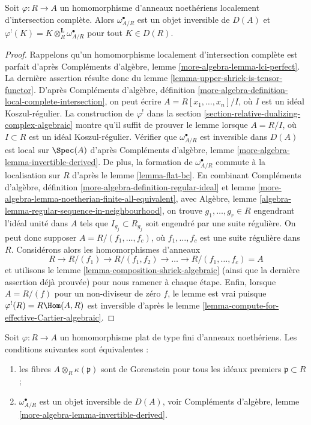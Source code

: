 \begin{lemma}
\label{lemma-lci-shriek}
Soit $\varphi : R \to A$ un homomorphisme d'anneaux noethériens localement d'intersection complète.
Alors $\omega_{A/R}^\bullet$ est un objet inversible de $D(A)$ et $\varphi^!(K) = K \otimes_R^\mathbf{L} \omega_{A/R}^\bullet$ pour tout $K \in D(R)$.
\end{lemma}

\begin{proof}
Rappelons qu'un homomorphisme localement d'intersection complète
est parfait d'après Compléments d'algèbre, lemme \ref{more-algebra-lemma-lci-perfect}.
La dernière assertion résulte donc du lemme \ref{lemma-upper-shriek-is-tensor-functor}.
D'après Compléments d'algèbre, définition \ref{more-algebra-definition-local-complete-intersection},
on peut écrire $A = R[x_1, \ldots, x_n]/I$, où $I$ est un idéal Koszul-régulier.
La construction de $\varphi^!$ dans la section \ref{section-relative-dualizing-complex-algebraic}
montre qu'il suffit de prouver le lemme lorsque $A = R/I$,
où $I \subset R$ est un idéal Koszul-régulier.
Vérifier que $\omega_{A/R}^\bullet$ est inversible dans $D(A)$ est local sur $\Spec(A)$
d'après Compléments d'algèbre, lemme \ref{more-algebra-lemma-invertible-derived}.
De plus, la formation de $\omega_{A/R}^\bullet$ commute à la localisation sur $R$
d'après le lemme \ref{lemma-flat-bc}.
En combinant Compléments d'algèbre, définition \ref{more-algebra-definition-regular-ideal} et lemme \ref{more-algebra-lemma-noetherian-finite-all-equivalent},
avec Algèbre, lemme \ref{algebra-lemma-regular-sequence-in-neighbourhood}, on trouve $g_1, \ldots, g_r \in R$
engendrant l'idéal unité dans $A$ tels que $I_{g_j} \subset R_{g_j}$
soit engendré par une suite régulière.
On peut donc supposer $A = R/(f_1, \ldots, f_c)$, où $f_1, \ldots, f_c$ est une suite régulière dans $R$.
Considérons alors les homomorphismes d'anneaux
$$
R \to R/(f_1) \to R/(f_1, f_2) \to \ldots \to R/(f_1, \ldots, f_c) = A
$$
et utilisons le lemme \ref{lemma-composition-shriek-algebraic} (ainsi que la dernière assertion déjà prouvée)
pour nous ramener à chaque étape.
Enfin, lorsque $A = R/(f)$ pour un non-diviseur de zéro $f$,
le lemme est vrai puisque $\varphi^!(R) = R\Hom(A, R)$ est inversible d'après le lemme \ref{lemma-compute-for-effective-Cartier-algebraic}.
\end{proof}

\begin{lemma}
\label{lemma-gorenstein-shriek}
Soit $\varphi : R \to A$ un homomorphisme plat de type fini d'anneaux noethériens.
Les conditions suivantes sont équivalentes :
\begin{enumerate}
\item les fibres $A \otimes_R \kappa(\mathfrak p)$ sont de Gorenstein pour tous les idéaux premiers $\mathfrak p \subset R$ ;
\item $\omega_{A/R}^\bullet$ est un objet inversible de $D(A)$,
voir Compléments d'algèbre, lemme \ref{more-algebra-lemma-invertible-derived}.
\end{enumerate}
\end{lemma}

